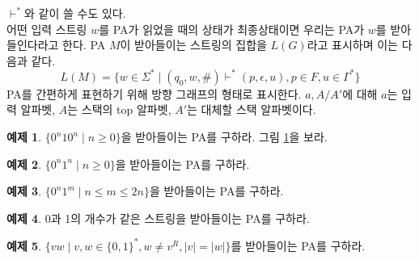 \documentclass[b5paper]{book}
\theoremstyle{definition}
\newtheorem{ex}{예제}[chapter]
\begin{document}
$\vdash^*$와 같이 쓸 수도 있다. \\ 
어떤 입력 스트링 $w$를 PA가 읽었을 때의 상태가 최종상태이면 우리는 PA가 $w$를 받아들인다라고 한다.
PA $M$이 받아들이는 스트링의 집합을 $L(G)$라고 표시하며 이는 다음과 같다.
$$L(M) = \{w \in \Sigma^* \;\vert\; (q_0, w, \text{\#}) \vdash^* 
(p, \epsilon, u), p\in F, u \in \Gamma^*\}$$
PA를 간편하게 표현하기 위해 방향 그래프의 형태로 표시한다. $a, A/A'$에 대해 $a$는 입력 알파벳,
$A$는 스택의 top 알파벳, $A'$는 대체할 스택 알파벳이다. 
\begin{ex} \label{0n10n_ex}
    $\{0^n10^{n} \;\vert\; n \ge 0 \}$을 받아들이는 PA를 구하라. 그림 \ref{0n10n}을 보라.
\end{ex}
\begin{figure}[!ht]
    \centering
    \caption{} 
    \label{0n10n}
\end{figure}
\begin{ex}
    $\{0^n1^{n} \;\vert\; n \ge 0 \}$을 받아들이는 PA를 구하라.
\end{ex}
\begin{ex}
    $\{0^n1^{m} \;\vert\; n \le m \le 2n \}$을 받아들이는 PA를 구하라.
\end{ex}
\begin{ex}
    0과 1의 개수가 같은 스트링을 받아들이는 PA를 구하라. 
\end{ex}
\begin{ex}
    $\{ vw \;\vert\; v,w \in \{0,1\}^*, w \neq v^R , \vert v \vert = \vert w \vert \}$를 
    받아들이는 PA를 구하라.
\end{ex}
\end{document}
